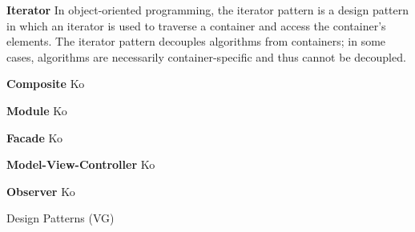 \documentclass{article}
\begin{document}
\begin{Parallel}[v]{0.48\textwidth}{0.48\textwidth}
{        \textbf{Iterator}\newline
        In object-oriented programming, the iterator pattern is a
        design pattern in which an iterator is used to traverse a
        container and access the container's elements.
        The iterator pattern decouples algorithms from containers;
        in some cases, algorithms are necessarily container-specific
        and thus cannot be decoupled.

        \textbf{Composite}\newline
        Ko

        \textbf{Module}\newline
        Ko

        \textbf{Facade}\newline
        Ko

        \textbf{Model-View-Controller}\newline
        Ko

        \textbf{Observer}\newline
        Ko
    }
    \ParallelPar
\end{Parallel}
\newpage


\begin{center}
    {\huge Design Patterns (VG)}
\end{center}
\begin{Parallel}[v]{0.48\textwidth}{0.48\textwidth}
    \ParallelPar
\end{Parallel}
\end{document}

